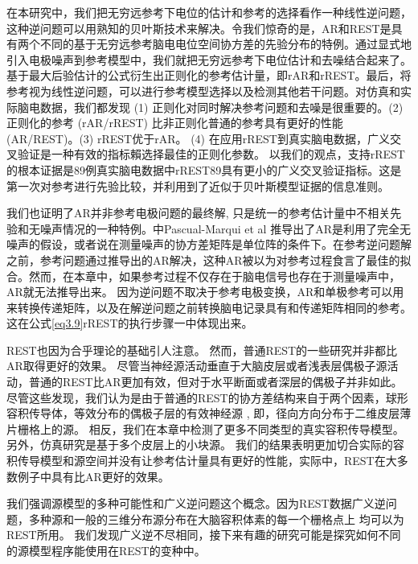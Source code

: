 在本研究中，我们把无穷远参考下电位的估计和参考的选择看作一种线性逆问题，这种逆问题可以用熟知的贝叶斯技术来解决。令我们惊奇的是，AR和REST是具有两个不同的基于无穷远参考脑电电位空间协方差的先验分布的特例。通过显式地引入电极噪声到参考模型中，我们就把无穷远参考下电位估计和去噪结合起来了。基于最大后验估计的公式衍生出正则化的参考估计量，即rAR和rREST。最后，将参考视为线性逆问题，可以进行参考模型选择以及检测其他若干问题。对仿真和实际脑电数据，我们都发现 (1) 正则化对同时解决参考问题和去噪是很重要的。(2) 正则化的参考 (rAR/rREST) 比非正则化普通的参考具有更好的性能
(AR/REST)。(3) rREST优于rAR。 (4) 在应用rREST到真实脑电数据，广义交叉验证是一种有效的指标賴选择最佳的正则化参数。 以我们的观点，支持rREST的根本证据是89例真实脑电数据中rREST89具有更小的广义交叉验证指标。这是第一次对参考进行先验比较，并利用到了近似于贝叶斯模型证据的信息准则。

我们也证明了AR并非参考电极问题的最终解, 只是统一的参考估计量中不相关先验和无噪声情况的一种特例。\cite{pascual-marqui_assessing_2011}中Pascual-Marqui et al 推导出了AR是利用了完全无噪声的假设，或者说在测量噪声的协方差矩阵是单位阵的条件下。在参考逆问题解之前，参考问题通过推导出的AR解决，这种AR被以为对参考过程食言了最佳的拟合。然而，在本章中，如果参考过程不仅存在于脑电信号也存在于测量噪声中，AR就无法推导出来。 因为逆问题不取决于参考电极变换，AR和单极参考可以用来转换传递矩阵，以及在解逆问题之前转换脑电记录具有和传递矩阵相同的参考。 这在公式\eqref{eq3.9}rREST的执行步骤一中体现出来。 

REST也因为合乎理论的基础引人注意。 然而，普通REST的一些研究并非都比AR取得更好的效果。 尽管当神经源活动垂直于大脑皮层或者浅表层偶极子源活动，普通的REST比AR更加有效，但对于水平断面或者深层的偶极子并非如此。 尽管这些发现，我们认为是由于普通的REST的协方差结构来自于两个因素，球形容积传导体，等效分布的偶极子层的有效神经源 , 即，径向方向分布于二维皮层薄片栅格上的源。 相反，我们在本章中检测了更多不同类型的真实容积传导模型。另外，仿真研究是基于多个皮层上的小块源。 我们的结果表明更加切合实际的容积传导模型和源空间并没有让参考估计量具有更好的性能，实际中，REST在大多数例子中具有比AR更好的效果。

我们强调源模型的多种可能性和广义逆问题这个概念。因为REST数据广义逆问题，多种源和一般的三维分布源分布在大脑容积体素的每一个栅格点上 均可以为REST所用。 我们发现广义逆不尽相同，接下来有趣的研究可能是探究如何不同的源模型程序能使用在REST的变种中。

